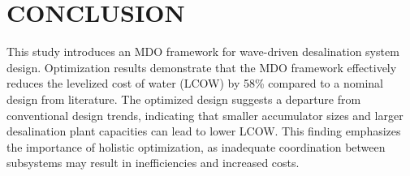 \documentclass[twocolumn,10pt]{asme2e}
\begin{document}

\section{CONCLUSION}


This study introduces an MDO framework for wave-driven desalination system design. Optimization results demonstrate that the MDO framework effectively reduces the levelized cost of water (LCOW) by 58\% compared to a nominal design from literature. The optimized design suggests a departure from conventional design trends, indicating that smaller accumulator sizes and larger desalination plant capacities can lead to lower LCOW. This finding emphasizes the importance of holistic optimization, as inadequate coordination between subsystems may result in inefficiencies and increased costs.
\end{document}

